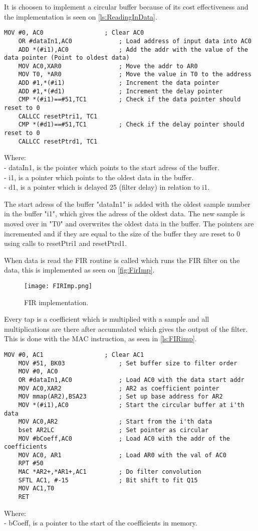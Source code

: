 It is choosen to implement a circular buffer because of its cost effectiveness and the implementation is seen on \autoref{ls:ReadingInData}.
\begin{lstlisting}[language={[x86masm]Assembler}, caption = {Reading data in},label={ls:ReadingInData}]
	MOV #0, AC0					; Clear AC0
	OR #dataIn1,AC0				; Load address of input data into AC0
	ADD *(#i1),AC0				; Add the addr with the value of the data pointer (Point to oldest data)
	MOV AC0,XAR0				; Move the addr to AR0
	MOV T0, *AR0				; Move the value in T0 to the address
	ADD #1,*(#i1)				; Increment the data pointer
	ADD #1,*(#d1)				; Increment the delay pointer
	CMP *(#i1)==#51,TC1			; Check if the data pointer should reset to 0
	CALLCC resetPtri1, TC1
	CMP *(#d1)==#51,TC1			; Check if the delay pointer should reset to 0
	CALLCC resetPtrd1, TC1
\end{lstlisting}
Where: \\
- dataIn1, is the pointer which points to the start adress of the buffer. \\
- i1, is a pointer which points to the oldest data in the buffer. \\
- d1, is a pointer which is delayed 25 (filter delay) in relation to i1. 

The start adress of the buffer "dataIn1" is added with the oldest sample number in the buffer "i1", which gives the adress of the oldest data. The new sample is moved over in "T0" and overwrites the oldest data in the buffer. The pointers are incremented and if they are equal to the size of the buffer they are reset to 0 using calls to resetPtri1 and resetPtrd1.

When data is read the FIR routine is called which runs the FIR filter on the data, this is implemented as seen on \autoref{fig:FirImp}.
\begin{figure}[H]
\centering
\texttt{[image: FIRImp.png]}
\label{fig:FirImp}
\caption{FIR implementation.}
\end{figure}
Every tap is a coefficient which is multiplied with a sample and all multiplications are there after accumulated which gives the output of the filter. This is done with the MAC instruction, as seen in \autoref{ls:FIRimp}.
\begin{lstlisting}[language={[x86masm]Assembler}, caption = {FIR algorithm.},label={ls:FIRimp}]
	MOV #0, AC1					; Clear AC1
	MOV #51, BK03				; Set buffer size to filter order
	MOV #0, AC0
	OR #dataIn1,AC0				; Load AC0 with the data start addr
	MOV AC0,XAR2				; AR2 as coefficient pointer
	MOV mmap(AR2),BSA23        	; Set up base address for AR2
	MOV *(#i1),AC0				; Start the circular buffer at i'th data
	MOV AC0,AR2					; Start from the i'th data
	bset AR2LC					; Set pointer as circular
	MOV #bCoeff,AC0				; Load AC0 with the addr of the coefficients
	MOV AC0, AR1				; Load AR0 with the val of AC0
	RPT #50						
	MAC *AR2+,*AR1+,AC1 		; Do filter convolution
	SFTL AC1, #-15				; Bit shift to fit Q15
	MOV AC1,T0     				
	RET
\end{lstlisting}
Where: \\
- bCoeff, is a pointer to the start of the coefficients in memory. 

